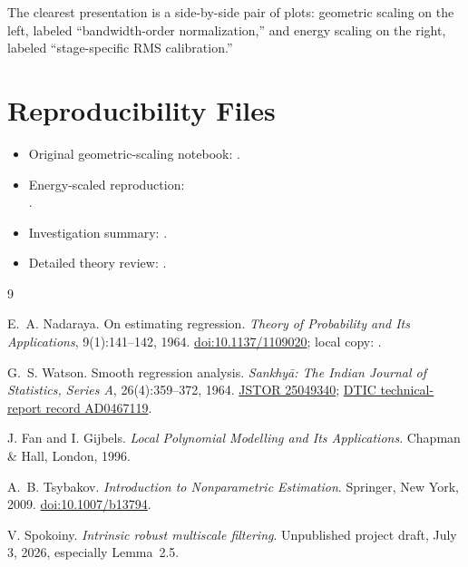 \documentclass[11pt]{article}
\begin{document}
The clearest presentation is a side-by-side pair of plots: geometric scaling on
the left, labeled ``bandwidth-order normalization,'' and energy scaling on the
right, labeled ``stage-specific RMS calibration.''

\section{Reproducibility Files}

\begin{itemize}
    \item Original geometric-scaling notebook:
    .
    \item Energy-scaled reproduction:
    \\
    .
    \item Investigation summary:
    .
    \item Detailed theory review:
    .
\end{itemize}

\begin{thebibliography}{9}

E.~A. Nadaraya.
On estimating regression.
\emph{Theory of Probability and Its Applications}, 9(1):141--142, 1964.
\href{https://doi.org/10.1137/1109020}{doi:10.1137/1109020};
local copy: .

G.~S. Watson.
Smooth regression analysis.
\emph{Sankhy\={a}: The Indian Journal of Statistics, Series A},
26(4):359--372, 1964.
\href{https://www.jstor.org/stable/25049340}{JSTOR 25049340};
\href{https://dtic.minsky.ai/index/AD0467119}{DTIC technical-report record
AD0467119}.

J. Fan and I. Gijbels.
\emph{Local Polynomial Modelling and Its Applications}.
Chapman \& Hall, London, 1996.

A.~B. Tsybakov.
\emph{Introduction to Nonparametric Estimation}.
Springer, New York, 2009.
\href{https://doi.org/10.1007/b13794}{doi:10.1007/b13794}.

V. Spokoiny.
\emph{Intrinsic robust multiscale filtering}.
Unpublished project draft, July 3, 2026, especially Lemma~2.5.

\end{thebibliography}
\end{document}
